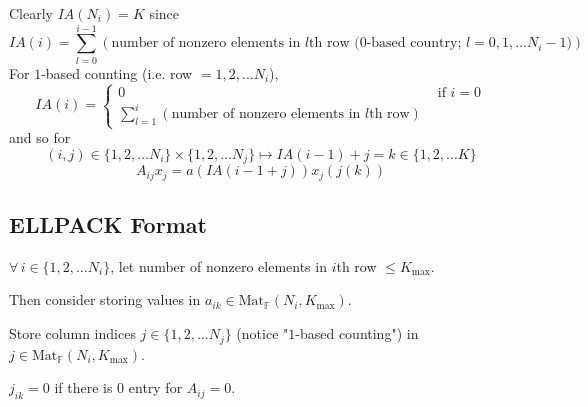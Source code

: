 \documentclass[10pt]{amsart}
\begin{document}
\begin{multicols*}{2}
Clearly $IA(N_i)=K$ since 
\[
IA(i) = \sum_{l=0}^{i-1} (\text{number of nonzero elements in $l$th row ($0$-based country; $l=0,1,\dots N_i-1$)})
\]
For $1$-based counting (i.e. row $=1,2,\dots N_i$), 
\begin{equation}
IA(i) = \begin{cases} 0 & \text{ if } i=0 \\
 \sum_{l=1}^i (\text{number of nonzero elements in $l$th row}) & \end{cases}
\end{equation}
and so for 
\[
(i,j ) \in \lbrace 1,2, \dots N_i \rbrace \times \lbrace 1,2, \dots N_j \rbrace \mapsto IA(i-1) + j = k \in \lbrace 1,2, \dots K \rbrace 
\]
\[
A_{ij}x_j = a(IA(i-1+j))x_j(j(k))
\]

\subsection{ELLPACK Format}

$\forall \, i \in \lbrace 1, 2, \dots N_i \rbrace$, let number of nonzero elements in $i$th row $\leq K_{\text{max}}$.  

Then consider storing values in $a_{ik} \in \text{Mat}_{\mathbb{F}}(N_i,K_{\text{max}})$.  

Store column indices $j\in \lbrace 1,2, \dots N_j \rbrace$ (notice "$1$-based counting") in $j\in \text{Mat}_{\mathbb{F}}(N_i,K_{\text{max}})$.  

$j_{ik} =0$ if there is $0$ entry for $A_{ij}=0$.  




\end{multicols*}
\end{document}
